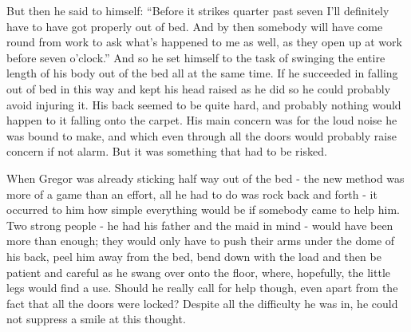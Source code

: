 \documentclass[12pt]{report}
\begin{document}
But then he said to himself: ``Before it strikes quarter past seven I'll
definitely have to have got properly out of bed. And by then somebody
will have come round from work to ask what's happened to me as well, as
they open up at work before seven o'clock.'' And so he set himself to
the task of swinging the entire length of his body out of the bed all at
the same time. If he succeeded in falling out of bed in this way and
kept his head raised as he did so he could probably avoid injuring it.
His back seemed to be quite hard, and probably nothing would happen to
it falling onto the carpet. His main concern was for the loud noise he
was bound to make, and which even through all the doors would probably
raise concern if not alarm. But it was something that had to be risked.

When Gregor was already sticking half way out of the bed - the new
method was more of a game than an effort, all he had to do was rock back
and forth - it occurred to him how simple everything would be if
somebody came to help him. Two strong people - he had his father and the
maid in mind - would have been more than enough; they would only have to
push their arms under the dome of his back, peel him away from the bed,
bend down with the load and then be patient and careful as he swang over
onto the floor, where, hopefully, the little legs would find a use.
Should he really call for help though, even apart from the fact that all
the doors were locked? Despite all the difficulty he was in, he could
not suppress a smile at this thought.
\end{document}
